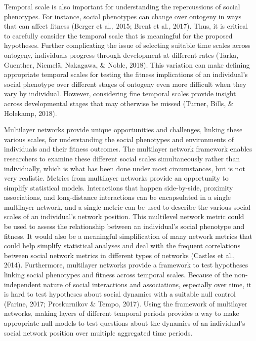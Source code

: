 \documentclass[]{article}
\begin{document}
Temporal scale is also important for understanding the repercussions of social
phenotypes. For instance, social phenotypes can change over ontogeny in ways
that can affect fitness (Berger et al., 2015; Brent et al., 2017). Thus, it is
critical to carefully consider the temporal scale that is meaningful for the
proposed hypotheses. Further complicating the issue of selecting suitable time
scales across ontogeny, individuals progress through development at different
rates (Tarka, Guenther, Niemelä, Nakagawa, \& Noble, 2018). This variation can
make defining appropriate temporal scales for testing the fitness implications
of an individual's social phenotype over different stages of ontogeny even more
difficult when they vary by individual. However, considering fine temporal
scales provide insight across developmental stages that may otherwise be missed
(Turner, Bills, \& Holekamp, 2018).

Multilayer networks provide unique opportunities and challenges, linking these
various scales, for understanding the social phenotypes and environments of
individuals and their fitness outcomes. The multilayer network framework enables
researchers to examine these different social scales simultaneously rather than
individually, which is what has been done under most circumstances, but is not
very realistic. Metrics from multilayer networks provide an opportunity to
simplify statistical models. Interactions that happen side-by-side, proximity
associations, and long-distance interactions can be encapsulated in a single
multilayer network, and a single metric can be used to describe the various
social scales of an individual's network position. This multilevel network
metric could be used to assess the relationship between an individual's social
phenotype and fitness. It would also be a meaningful simplification of many
network metrics that could help simplify statistical analyses and deal with the
frequent correlations between social network metrics in different types of
networks (Castles et al., 2014). Furthermore, multilayer networks provide a
framework to test hypotheses linking social phenotypes and fitness across
temporal scales. Because of the non-independent nature of social interactions
and associations, especially over time, it is hard to test hypotheses about
social dynamics with a suitable null control (Farine, 2017; Proskurnikov \&
Tempo, 2017). Using the framework of multilayer networks, making layers of
different temporal periods provides a way to make appropriate null models to
test questions about the dynamics of an individual's social network position
over multiple aggregated time periods.
\end{document}
